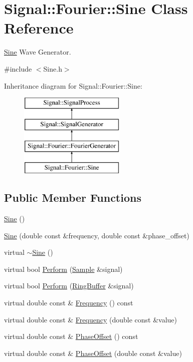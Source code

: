 \hypertarget{classSignal_1_1Fourier_1_1Sine}{\section{Signal\+:\+:Fourier\+:\+:Sine Class Reference}
\label{classSignal_1_1Fourier_1_1Sine}
}


\hyperlink{classSignal_1_1Fourier_1_1Sine}{Sine} Wave Generator.  




{\ttfamily \#include $<$Sine.\+h$>$}

Inheritance diagram for Signal\+:\+:Fourier\+:\+:Sine\+:\begin{figure}[H]
\begin{center}
\leavevmode
\includegraphics[height=4.000000cm]{classSignal_1_1Fourier_1_1Sine}
\end{center}
\end{figure}
\subsection*{Public Member Functions}
\begin{DoxyCompactItemize}
\item 
\hyperlink{classSignal_1_1Fourier_1_1Sine_a432f8893c0b3c5a103009f8ad0e520e5}{Sine} ()
\item 
\hyperlink{classSignal_1_1Fourier_1_1Sine_a70dc360d7d6d64a249e3840547d251fb}{Sine} (double const \&frequency, double const \&phase\+\_\+offset)
\item 
virtual \hyperlink{classSignal_1_1Fourier_1_1Sine_abc5739e46fb95ff443948bf990575f26}{$\sim$\+Sine} ()
\item 
virtual bool \hyperlink{classSignal_1_1Fourier_1_1Sine_aa35c77904f8d7a0de6fa4895d6c53644}{Perform} (\hyperlink{classSignal_1_1Sample}{Sample} \&signal)
\item 
virtual bool \hyperlink{classSignal_1_1Fourier_1_1Sine_a5d951e5fbfc77354bddab9dfedea008f}{Perform} (\hyperlink{classSignal_1_1RingBuffer}{Ring\+Buffer} \&signal)
\item 
virtual double const \& \hyperlink{classSignal_1_1SignalGenerator_a96af42ee68f94e9b04d034fd68b73ecd}{Frequency} () const 
\item 
virtual double const \& \hyperlink{classSignal_1_1SignalGenerator_af83b532bf3ddc3637c2fd7a1dfd095cb}{Frequency} (double const \&value)
\item 
virtual double const \& \hyperlink{classSignal_1_1SignalGenerator_ac2538ec946f001e394d2416fda698d1c}{Phase\+Offset} () const 
\item 
virtual double const \& \hyperlink{classSignal_1_1SignalGenerator_ac6a103ff72beaa338f6d18c812522d78}{Phase\+Offset} (double const \&value)
\end{DoxyCompactItemize}
